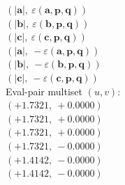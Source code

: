 \documentclass[a4paper,11pt]{article}
\newcommand{\vc}[1]{\ensuremath{\mathbf{#1}}}
\newcommand{\dnfagmiihhiejm}[1]{|\vc{#1}|}
\newcommand{\kblbmcpggoncpf}[3]{\varepsilon(\mathbf{#1},\mathbf{#2},\mathbf{#3})}
\begin{document}
$(\dnfagmiihhiejm{a},\ \kblbmcpggoncpf{a}{p}{q})$\\
$(\dnfagmiihhiejm{b},\ \kblbmcpggoncpf{b}{p}{q})$\\
$(\dnfagmiihhiejm{c},\ \kblbmcpggoncpf{c}{p}{q})$\\
$(\dnfagmiihhiejm{a},\ -\kblbmcpggoncpf{a}{p}{q})$\\
$(\dnfagmiihhiejm{b},\ -\kblbmcpggoncpf{b}{p}{q})$\\
$(\dnfagmiihhiejm{c},\ -\kblbmcpggoncpf{c}{p}{q})$\\
\quad Eval-pair multiset $(u, v)$:\\
$(+1.7321,\ +0.0000)$\\
$(+1.7321,\ +0.0000)$\\
$(+1.7321,\ +0.0000)$\\
$(+1.7321,\ -0.0000)$\\
$(+1.4142,\ -0.0000)$\\
$(+1.4142,\ -0.0000)$\\
\end{document}
